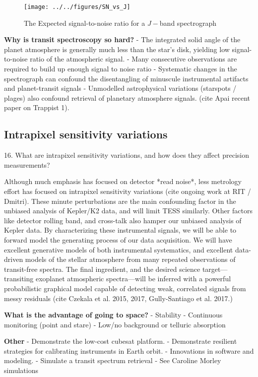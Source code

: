 \documentclass[12pt]{article}
\begin{document}
\begin{figure}
    \centering
        \texttt{[image: ../../figures/SN\_vs\_J]}
    \caption{The Expected signal-to-noise ratio for a $J-$band spectrograph}\label{fig:StoNj}
\end{figure}


\textbf{Why is transit spectroscopy so hard?}
- The integrated solid angle of the planet atmosphere is generally much less than the star's disk, yielding low signal-to-noise ratio of the atmospheric signal.
- Many consecutive observations are required to build up enough signal to noise ratio
- Systematic changes in the spectrograph can confound the disentangling of minuscule instrumental artifacts and planet-transit signals
- Unmodelled astrophysical variations (starspots / plages) also confound retrieval of planetary atmosphere signals. (cite Apai recent paper on Trappist 1).

\subsection{Intrapixel sensitivity variations}
16. What are intrapixel sensitivity variations, and how does they affect precision measurements?

Although much emphasis has focused on detector *read noise*, less metrology effort has focused on intrapixel sensitivity variations (cite ongoing work at RIT / Dmitri).  These minute perturbations are the main confounding factor in the unbiased analysis of Kepler/K2 data, and will limit TESS similarly.  Other factors like detector rolling band, and cross-talk also hamper our unbiased analysis of Kepler data.  By characterizing these instrumental signals, we will be able to forward model the generating process of our data acquisition.  We will have excellent generative models of both instrumental systematics, and excellent data-driven models of the stellar atmosphere from many repeated observations of transit-free spectra.  The final ingredient, and the desired science target---transiting exoplanet atmospheric spectra---will be inferred with a powerful probabilistic graphical model capable of detecting weak, correlated signals from messy residuals (cite Czekala et al. 2015, 2017, Gully-Santiago et al. 2017.)

\textbf{What is the advantage of going to space?}
- Stability
- Continuous monitoring (point and stare)
- Low/no background or telluric absorption

\textbf{Other}
- Demonstrate the low-cost cubesat platform.
- Demonstrate resilient strategies for calibrating instruments in Earth orbit.
- Innovations in software and modeling.
- Simulate a transit spectrum retrieval
- See Caroline Morley simulations
\end{document}
